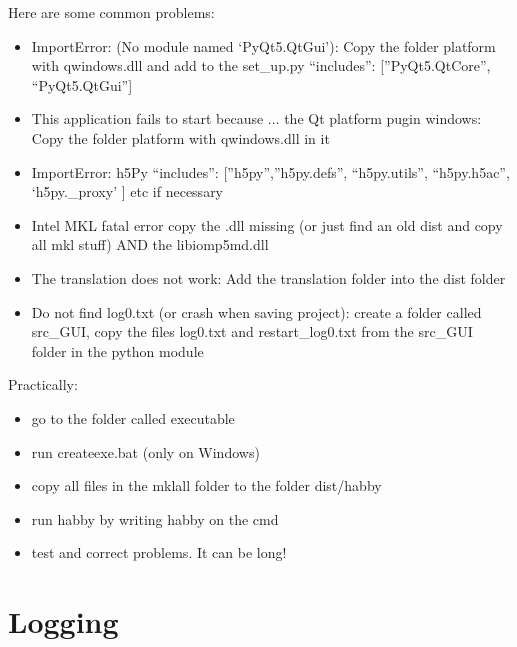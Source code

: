 \documentclass[letterpaper,10pt,english]{sphinxmanual}
\begin{document}
Here are some common problems:
\begin{itemize}
\item {} 
ImportError: (No module named `PyQt5.QtGui'): Copy the folder platform with qwindows.dll and add to the set\_up.py  ``includes'': {[}''PyQt5.QtCore'', ``PyQt5.QtGui''{]}

\item {} 
This application fails to start because ... the Qt platform pugin windows: Copy the folder platform with qwindows.dll in it

\item {} 
ImportError: h5Py ``includes'': {[}''h5py'',''h5py.defs'', ``h5py.utils'', ``h5py.h5ac'', `h5py.\_proxy' {]} etc if necessary

\item {} 
Intel MKL fatal error copy the .dll missing (or just find an old dist and copy all mkl stuff) AND the libiomp5md.dll

\item {} 
The translation does not work: Add the translation folder into the dist folder

\item {} 
Do not find log0.txt (or crash when saving project): create a folder called src\_GUI, copy the files log0.txt and restart\_log0.txt from the src\_GUI folder in the python module

\end{itemize}

Practically:
\begin{itemize}
\item {} 
go to the folder called executable

\item {} 
run createexe.bat (only on Windows)

\item {} 
copy all files in the mklall folder to the folder dist/habby

\item {} 
run habby by writing habby on the cmd

\item {} 
test and correct problems. It can be long!

\end{itemize}


\section{Logging}
\label{\detokenize{index:logging}}
\end{document}
